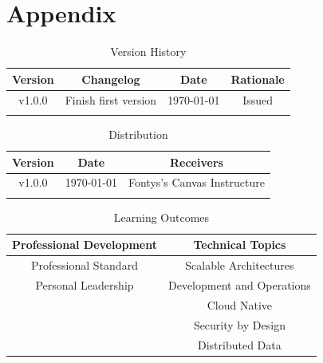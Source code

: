 \documentclass{article}
\begin{document}
\section{Appendix}
\label{section:appendix}
    \begin{table}[h]
        \centering
        \begin{tabular}{ | c | c | c | c | }
            \hline \textbf{Version} & \textbf{Changelog} & \textbf{Date} & \textbf{Rationale} \\
            \hline v1.0.0 & Finish first version & \today & Issued \\
            \hline & & & \\
            \hline
        \end{tabular}
        \caption{Version History}
        \label{tab:version-history}
    \end{table}

    \begin{table}[h]
        \centering
        \begin{tabular}{ | c | c | c | }
            \hline \textbf{Version} & \textbf{Date} & \textbf{Receivers} \\
            \hline v1.0.0 & \today & Fontys's Canvas Instructure \\
            \hline & & \\
            \hline
        \end{tabular}
        \caption{Distribution}
        \label{tab:distribution}
    \end{table}

    \begin{table}[h!]
        \centering
        \begin{tabular}{|c|c|}
             \hline \textbf{Professional Development} & \textbf{Technical Topics} \\
             \hline Professional Standard & Scalable Architectures \\
             \hline Personal Leadership & Development and Operations \\
             \hline & Cloud Native \\
             \hline & Security by Design \\
             \hline & Distributed Data \\
             \hline 
        \end{tabular}
        \caption{Learning Outcomes}
        \label{tab:learning-outcomes}
    \end{table}

    \newpage
    \printbibliography
\end{document}
